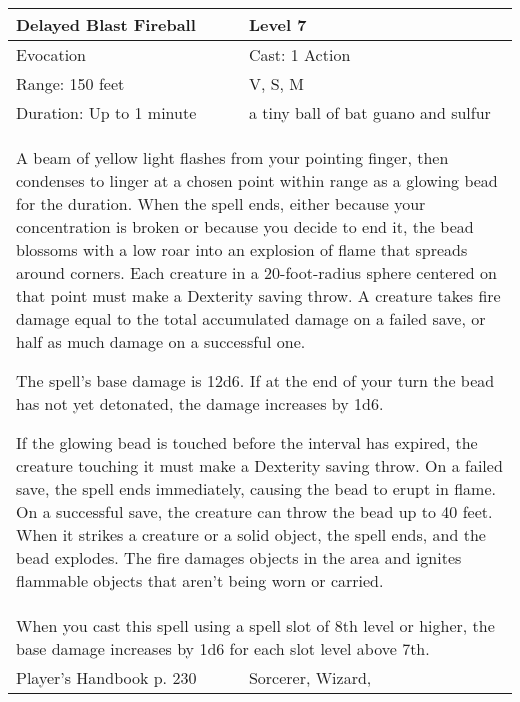 \documentclass[11pt]{report}
\begin{document}
\begin{table}[H]
	\begin{tabular}{||p{6cm}|p{6cm}||}
		\hline\hline
		\bf{Delayed Blast Fireball} & Level 7\\ \hline
		Evocation & Cast: 1 Action\\ \hline
		Range: 150 feet & V, S, M \\ \hline
		Duration: Up to 1 minute & a tiny ball of bat guano and sulfur\\ \hline
		\multicolumn{2}{||p{12cm}||}{A beam of yellow light flashes from your pointing finger, then condenses to linger at a chosen point within range as a glowing bead for the duration. 
When the spell ends, either because your concentration is broken or because you decide to end it, the bead blossoms with a low roar into an explosion of flame that spreads around corners. Each creature in a 20-foot-radius sphere centered on that point must make a Dexterity saving throw. A creature takes fire damage equal to the total accumulated damage on a failed save, or half as much damage on a successful one. 

The spell’s base damage is 12d6. If at the end of your turn the bead has not yet detonated, the damage increases by 1d6. 

If the glowing bead is touched before the interval has expired, the creature touching it must make a Dexterity saving throw. On a failed save, the spell ends immediately, causing the bead to erupt in flame. On a successful save, the creature can throw the bead up to 40 feet. When it strikes a creature or a solid object, the spell ends, and the bead explodes. 
The fire damages objects in the area and ignites flammable objects that aren’t being worn or carried.}\\ \hline
		\multicolumn{2}{||p{12cm}||}{When you cast this spell using a spell slot of 8th level or higher, the base damage increases by 1d6 for each slot level above 7th.}\\ \hline
Player's Handbook p. 230 & Sorcerer, Wizard, \\ \hline\hline
	\end{tabular}
\end{table}
\end{document}
